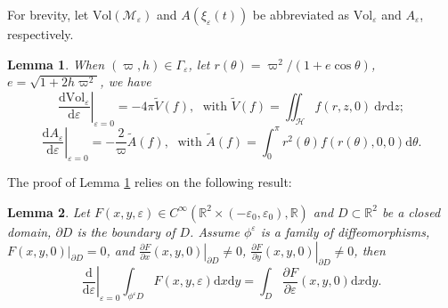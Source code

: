 \documentclass[11pt]{amsart}
\newcommand{\ep}{\varepsilon}
\newcommand{\om}{\varpi}
\newtheorem{lemma}{Lemma}[section]
\begin{document}
For brevity, let $\text{Vol}(\mathcal{M}_{\ep})$ and $A(\xi_{\ep}(t))$ be abbreviated as $\text{Vol}_{\ep}$ and $A_{\ep}$, respectively.
\begin{lemma}\label{lemma:the derivative of action and contact volume}
When $(\om,h)\in\Gamma_\ep$, let $r(\theta)=\om^{2}\slash(1+e\cos\theta)$, $e=\sqrt{1+2h\om^2}$, we have  
$$ \left. \frac{\mathrm{d}\text{Vol}_{\ep}}{\mathrm{d}\ep}\right| _{\ep=0}=-4\pi\tilde{V}(f), \; \text{ with } \tilde{V}(f)=\iint_{\mathcal{H}} f(r,z,0)\ \mathrm{d}r\mathrm{d}z;$$
$$ \left.\frac{\mathrm{d}A_{\ep}}{\mathrm{d}\ep}\right|_{\ep=0}=-\frac{2}{\om}\tilde{A}(f), \; \text{ with } \tilde{A}(f)=\int_{0}^{\pi}r^{2}(\theta)f(r(\theta),0,0)\mathrm{d}\theta.$$ 
\end{lemma}
The proof of Lemma \ref{lemma:the derivative of action and contact volume} relies on the following result:  
\begin{lemma}\label{lemma:The volume of D}
	Let $F(x,y,\ep)\in C^{\infty}(\mathbb{R}^{2}\times(-\ep_{0},\ep_{0}),\mathbb{R})$ and $D\subset\mathbb{R}^{2}$ be a closed domain, $\partial D$ is the boundary of $D$. Assume $\phi^{\ep}$ is a family of diffeomorphisms, $F(x,y,0)|_{\partial D}=0$, and $\left.\frac{\partial F}{\partial x}(x,y,0)\right|_{\partial D}\neq 0$, $\left.\frac{\partial F}{\partial y}(x,y,0)\right|_{\partial D}\neq 0$, then
	\begin{equation}
		\left. \frac{\mathrm{d}}{\mathrm{d}\ep}\right| _{\ep=0}\int_{\phi^{\ep}D}F(x,y,\ep)\mathrm{d}x\mathrm{d}y=\int_{D} \frac{\partial F}{\partial \ep}(x,y,0)\mathrm{d}x\mathrm{d}y.
	\end{equation}
\end{lemma}
\end{document}
